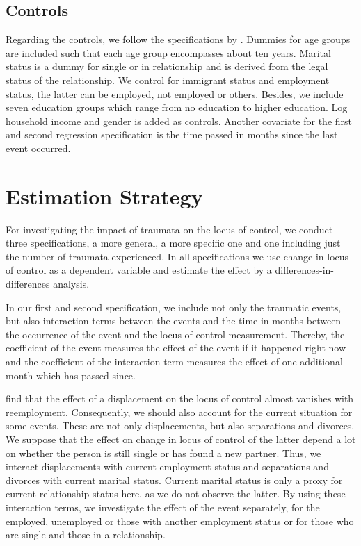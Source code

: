 \documentclass[12pt, a4paper, fleqn, parskip]{scrartcl}
\begin{document}
\subsection{Controls} %
\label{sub:controls}

Regarding the controls, we follow the specifications by \citet{cobb2013}.
Dummies for age groups are included such that each age group encompasses about
ten years. Marital status is a dummy for single or in relationship and is
derived from the legal status of the relationship. We control for immigrant
status and employment status, the latter can be employed, not employed or
others. Besides, we include seven education groups which range from no
education to higher education. Log household income and gender is added as
controls. Another covariate for the first and second regression specification
is the time passed in months since the last event occurred.



\section{Estimation Strategy}
\label{sec:estimation_strategy}

For investigating the impact of traumata on the locus of control, we conduct
three specifications, a more general, a more specific one and one including
just the number of traumata experienced. In all specifications we use change in
locus of control as a dependent variable and estimate the effect by a
differences-in-differences analysis.

In our first and second specification, we include not only the traumatic
events, but also interaction terms between the events and the time in months
between the occurrence of the event and the locus of control measurement.
Thereby, the coefficient of the event measures the effect of the event if it
happened right now and the coefficient of the interaction term measures the
effect of one additional month which has passed since.

\citet{preuss2017} find that the effect of a displacement on the locus of
control almost vanishes with reemployment. Consequently, we should also account
for the current situation for some events. These are not only displacements,
but also separations and divorces. We suppose that the effect on change in
locus of control of the latter depend a lot on whether the person is still
single or has found a new partner. Thus, we interact displacements with current
employment status and separations and divorces with current marital status.
Current marital status is only a proxy for current relationship status here, as
we do not observe the latter. By using these interaction terms, we investigate
the effect of the event separately, for the employed, unemployed or those with
another employment status or for those who are single and those in a
relationship.
\end{document}
